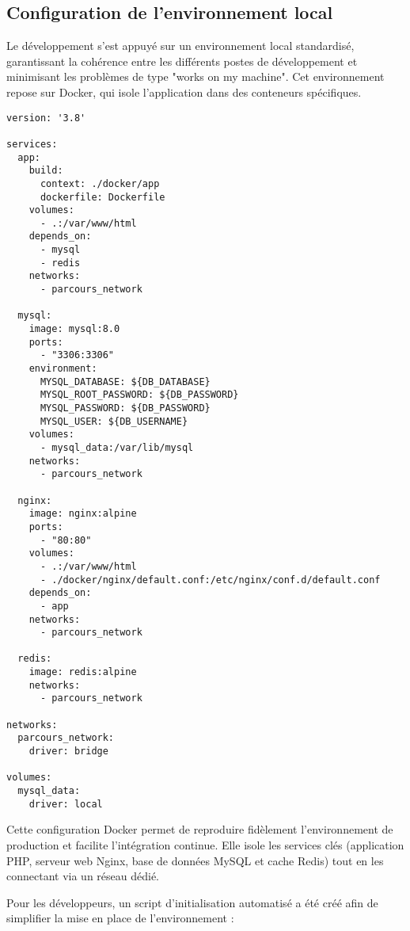 \documentclass[french,12pt]{report} %
\begin{document}
\subsection{Configuration de l'environnement local}

Le développement s'est appuyé sur un environnement local standardisé, garantissant la cohérence entre les différents postes de développement et minimisant les problèmes de type "works on my machine". Cet environnement repose sur Docker, qui isole l'application dans des conteneurs spécifiques.

\begin{lstlisting}[style=phpstyle, caption={docker-compose.yml pour l'environnement de développement}]
version: '3.8'

services:
  app:
    build:
      context: ./docker/app
      dockerfile: Dockerfile
    volumes:
      - .:/var/www/html
    depends_on:
      - mysql
      - redis
    networks:
      - parcours_network

  mysql:
    image: mysql:8.0
    ports:
      - "3306:3306"
    environment:
      MYSQL_DATABASE: ${DB_DATABASE}
      MYSQL_ROOT_PASSWORD: ${DB_PASSWORD}
      MYSQL_PASSWORD: ${DB_PASSWORD}
      MYSQL_USER: ${DB_USERNAME}
    volumes:
      - mysql_data:/var/lib/mysql
    networks:
      - parcours_network

  nginx:
    image: nginx:alpine
    ports:
      - "80:80"
    volumes:
      - .:/var/www/html
      - ./docker/nginx/default.conf:/etc/nginx/conf.d/default.conf
    depends_on:
      - app
    networks:
      - parcours_network

  redis:
    image: redis:alpine
    networks:
      - parcours_network

networks:
  parcours_network:
    driver: bridge

volumes:
  mysql_data:
    driver: local
\end{lstlisting}

Cette configuration Docker permet de reproduire fidèlement l'environnement de production et facilite l'intégration continue. Elle isole les services clés (application PHP, serveur web Nginx, base de données MySQL et cache Redis) tout en les connectant via un réseau dédié.

Pour les développeurs, un script d'initialisation automatisé a été créé afin de simplifier la mise en place de l'environnement :
\end{document}
